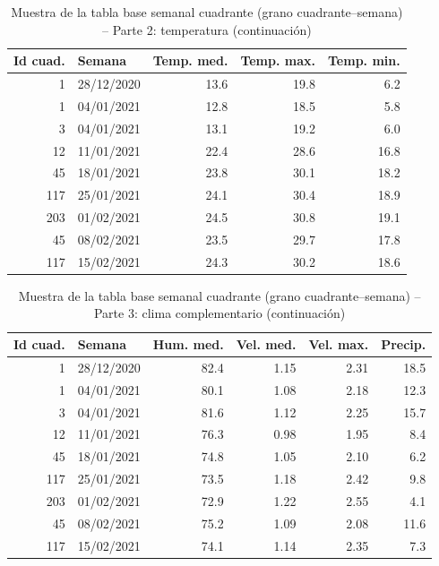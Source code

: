 \begin{table}[!htbp]
\centering
    \small
    \caption{Muestra de la tabla base semanal cuadrante (grano cuadrante--semana) -- Parte 2: temperatura (continuación)}
    \label{tab:muestra_semanal_cuadrante_2}
    \begin{tabular}{r l r r r}
    \toprule
    \textbf{Id cuad.} & \textbf{Semana} & \textbf{Temp. med.} & \textbf{Temp. max.} & \textbf{Temp. min.} \\
    \midrule
      1 & 28/12/2020 & 13.6 & 19.8 &  6.2 \\
      1 & 04/01/2021 & 12.8 & 18.5 &  5.8 \\
      3 & 04/01/2021 & 13.1 & 19.2 &  6.0 \\
     12 & 11/01/2021 & 22.4 & 28.6 & 16.8 \\
     45 & 18/01/2021 & 23.8 & 30.1 & 18.2 \\
    117 & 25/01/2021 & 24.1 & 30.4 & 18.9 \\
    203 & 01/02/2021 & 24.5 & 30.8 & 19.1 \\
     45 & 08/02/2021 & 23.5 & 29.7 & 17.8 \\
    117 & 15/02/2021 & 24.3 & 30.2 & 18.6 \\
    \bottomrule
    \end{tabular}
    \end{table}

\begin{table}[!htbp]
\centering
    \small
    \caption{Muestra de la tabla base semanal cuadrante (grano cuadrante--semana) -- Parte 3: clima complementario (continuación)}
    \label{tab:muestra_semanal_cuadrante_3}
    \begin{tabular}{r l r r r r}
    \toprule
    \textbf{Id cuad.} & \textbf{Semana} & \textbf{Hum. med.} & \textbf{Vel. med.} & \textbf{Vel. max.} & \textbf{Precip.} \\
    \midrule
      1 & 28/12/2020 & 82.4 & 1.15 & 2.31 & 18.5 \\
      1 & 04/01/2021 & 80.1 & 1.08 & 2.18 & 12.3 \\
      3 & 04/01/2021 & 81.6 & 1.12 & 2.25 & 15.7 \\
     12 & 11/01/2021 & 76.3 & 0.98 & 1.95 &  8.4 \\
     45 & 18/01/2021 & 74.8 & 1.05 & 2.10 &  6.2 \\
    117 & 25/01/2021 & 73.5 & 1.18 & 2.42 &  9.8 \\
    203 & 01/02/2021 & 72.9 & 1.22 & 2.55 &  4.1 \\
     45 & 08/02/2021 & 75.2 & 1.09 & 2.08 & 11.6 \\
    117 & 15/02/2021 & 74.1 & 1.14 & 2.35 &  7.3 \\
    \bottomrule
    \end{tabular}
    \end{table}

